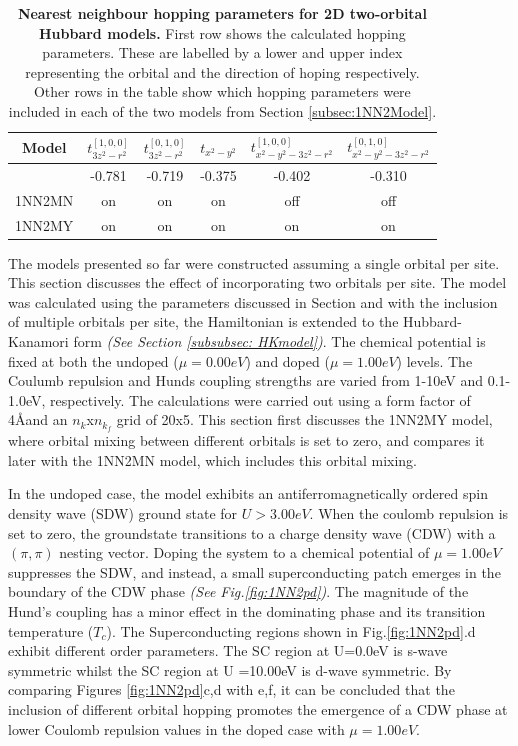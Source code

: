 \documentclass[12pt]{article}
\begin{document}
\begin{table}[h]
    \centering
    \begin{tabular}{|c|c|c|c|c|c|}
        \hline
       Model &$t^{[1,0,0]}_{3z^2-r^2}$  &$t^{[0,1,0]}_{3z^2-r^2}$  &  $t_{x^2 - y^2}$ &  $t^{[1,0,0]}_{x^2 - y^2 -3z^2-r^2} $ & $t^{[0,1,0]}_{x^2 - y^2 -3z^2-r^2} $ \\
        \hline
        & -0.781 & -0.719  &  -0.375 & -0.402 & -0.310\\
        \hline
        1NN2MN & on &  on  & on  & off & off  \\
        \hline
        1NN2MY & on &  on  & on  & on & on \\
          
        \hline
    \end{tabular}
    \caption{\textbf{Nearest neighbour hopping parameters for 2D  two-orbital Hubbard models.} First row shows the calculated hopping parameters.
    These are labelled by a lower and upper index representing the orbital and the direction of hoping respectively.
    Other rows in the table show which hopping parameters were included in each of the two models from Section \ref{subsec:1NN2Model}.}
    \label{tab:2D2orbparams }
\end{table}



The models presented so far were constructed assuming a single orbital per site. This section discusses the effect of incorporating
two orbitals per site. The model was calculated using the parameters discussed in Section  and with the inclusion of 
multiple orbitals per site, the  Hamiltonian is extended to the Hubbard-Kanamori form \textit{(See Section \ref{subsubsec: HKmodel})}. 
The chemical potential is fixed at both the undoped ($\mu = 0.00eV $) and doped ($\mu =1.00eV$) levels. The Coulumb repulsion and Hunds coupling strengths are varied from 1-10eV and 0.1-1.0eV, respectively.
The calculations were carried out using a form factor of 4\AA and an $n_k$x$n_{k_f}$ grid of 20x5. 
This section first discusses the 1NN2MY model, where orbital mixing between different orbitals is set to zero, and compares it later with the 1NN2MN model, which includes this orbital mixing. \par
\medskip
\noindent In the undoped case, the model exhibits an antiferromagnetically ordered spin density wave (SDW) ground state
for $U > 3.00eV$. When the coulomb repulsion is set to zero, the groundstate transitions to a charge density wave (CDW) with a $(\pi, \pi)$ nesting vector. 
Doping the system to a chemical potential of $\mu = 1.00eV$ suppresses the SDW, and instead, a small superconducting patch 
emerges in the boundary of the CDW phase \textit{(See Fig.{\ref{fig:1NN2pd}})}. The magnitude of the Hund's coupling has a minor effect in the dominating phase and its transition temperature  ($T_c$).
The Superconducting regions shown in Fig.\ref{fig:1NN2pd}.d exhibit different order parameters. The SC region at U=0.0eV is s-wave symmetric whilst the SC region at U =10.00eV
is d-wave symmetric. By comparing Figures \ref{fig:1NN2pd}c,d with e,f, it can be concluded that the inclusion of different orbital hopping promotes the emergence of a CDW phase at lower Coulomb repulsion values in the doped case with $\mu = 1.00eV$.
\end{document}
